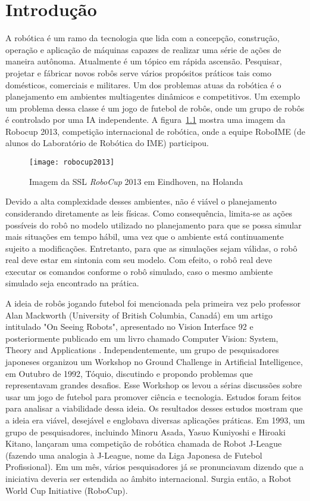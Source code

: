 \chapter{Introdução}

A robótica é um ramo da tecnologia que lida com a concepção, construção,
operação e aplicação de máquinas capazes de realizar uma série de ações de
maneira autônoma.  Atualmente é um tópico em rápida ascensão.  Pesquisar,
projetar e fábricar novos robôs serve vários propósitos práticos tais como
domésticos, comerciais e militares.  Um dos problemas atuas da robótica é o
planejamento em ambientes multiagentes dinâmicos e competitivos.  Um exemplo um
problema dessa classe é um jogo de futebol de robôs, onde um grupo de robôs é
controlado por uma IA independente.
A figura~\ref{fig:robocup2013} mostra uma imagem da Robocup 2013, competição
internacional de robótica, onde a equipe RoboIME (de alunos do Laboratório de
Robótica do IME) participou.

\begin{figure}[h]
  \centering
  \texttt{[image: robocup2013]}
  \caption{Imagem da SSL \textit{RoboCup} 2013 em Eindhoven, na Holanda}\label{fig:robocup2013}
\end{figure}

Devido a alta complexidade desses ambientes, não é viável o planejamento
considerando diretamente as leis físicas. Como consequência, limita-se as ações
possíveis do robô no modelo utilizado no planejamento para que se possa simular
mais situações em tempo hábil, uma vez que o ambiente está continuamente sujeito
a modificações. Entretanto, para que as simulações sejam válidas, o robô real
deve estar em sintonia com seu modelo. Com efeito, o robô real deve executar os
comandos conforme o robô simulado, caso o mesmo ambiente simulado seja
encontrado na prática.

A ideia de robôs jogando futebol foi mencionada pela primeira vez pelo professor
Alan Mackworth (University of British Columbia, Canadá) em um artigo intitulado
"On Seeing Robots", apresentado no Vision Interface 92 e posteriormente
publicado em um livro chamado Computer Vision: System, Theory and Applications
\cite{basu1993computer}.  Independentemente, um grupo de pesquisadores japoneses
organizou um Workshop no Ground Challenge in Artificial Intelligence, em Outubro
de 1992, Tóquio, discutindo e propondo problemas que representavam grandes
desafios.
Esse Workshop os levou a sérias discussões sobre usar um jogo de futebol para
promover ciência e tecnologia. Estudos foram feitos para analisar a viabilidade
dessa ideia. Os resultados desses estudos mostram que a ideia era viável,
desejável e englobava diversas aplicações práticas. Em 1993, um grupo de
pesquisadores, incluindo Minoru Asada, Yasuo Kuniyoshi e Hiroaki Kitano,
lançaram uma competição de robótica chamada de Robot J-League (fazendo uma
analogia à J-League, nome da Liga Japonesa de Futebol Profissional). Em um mês,
vários pesquisadores já se pronunciavam dizendo que a iniciativa deveria ser
estendida ao âmbito internacional. Surgia então, a Robot World Cup Initiative
(RoboCup).


